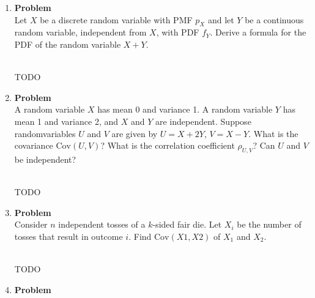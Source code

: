 \documentclass[12pt]{article}
\newenvironment{Ex}{\textbf{Problem}\vspace{.75em}\\}{}
\newcommand{\dd}[1]{\:\mathrm{d}{#1}}
\begin{document}
\begin{enumerate}
\begin{Ex}
\begin{solution}
\begin{equation}
\begin{aligned}
        \end{aligned}
      \end{equation}
      The distribution is then the derivative of the CDF of $Y$.
      \begin{equation}
        \label{eq:2-sol}
        \implies f_Y(y) = \frac{d}{\dd{y}}\int_{\{x|F_X(X) \le
          y\}}f_X(x) \dd{x}
      \end{equation}
      {\color{red} \huge CHECK}
    \end{solution}
  \end{Ex}
\item
  \begin{Ex}
    Let $X$ be a discrete random variable with PMF $p_X$ and let $Y$
    be a continuous random variable, independent from $X$, with PDF
    $f_Y$. Derive a formula for the PDF of the random variable $X+Y$.
    \begin{solution} \hfill \vspace{.75em} \\
      {\color{red} \huge TODO}
    \end{solution}
  \end{Ex}
\item
  \begin{Ex}
    A random variable $X$ has mean 0 and variance 1. A random variable
    $Y$ has mean 1 and variance 2, and $X$ and $Y$ are
    independent. Suppose randomvariables $U$ and $V$ are given by
    $U=X+2Y$, $V = X−Y$. What is the covariance $\text{Cov}(U,V)$?
    What is the correlation coefficient $\rho_{U,V}$? Can $U$ and $V$
    be independent?
    \begin{solution} \hfill \vspace{.75em} \\
      {\color{red} \huge TODO}
    \end{solution}
  \end{Ex}
\item
  \begin{Ex}
    Consider $n$ independent tosses of a $k$-sided fair die. Let $X_i$
    be the number of tosses that result in outcome $i$. Find
    $\text{Cov}(X1 , X2)$ of $X_1$ and $X_2$.
    \begin{solution} \hfill \vspace{.75em} \\
      {\color{red} \huge TODO}
    \end{solution}
  \end{Ex}
\item
  \begin{Ex}

\end{Ex}
\end{enumerate}
\end{document}
